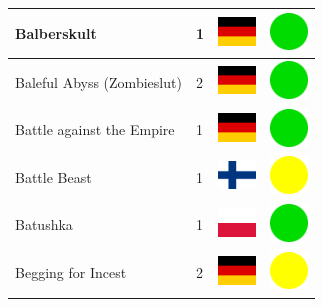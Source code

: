 \documentclass[12pt, a4paper, twoside]{report}
\begin{document}
\begin{center}
\begin{longtable}{|p{5cm}|p{2cm}|p{2cm}|p{2cm}|}
			Balberskult & 1 & \includegraphics[width=1cm]{4x3/de} & \includegraphics[width=1cm]{likes/y} \\ \hline
			Baleful Abyss (Zombieslut) & 2 & \includegraphics[width=1cm]{4x3/de} & \includegraphics[width=1cm]{likes/y} \\ \hline
			Battle against the Empire & 1 & \includegraphics[width=1cm]{4x3/de} & \includegraphics[width=1cm]{likes/y} \\ \hline
			Battle Beast & 1 & \includegraphics[width=1cm]{4x3/fi} & \includegraphics[width=1cm]{likes/m} \\ \hline
			Batushka & 1 & \includegraphics[width=1cm]{4x3/pl} & \includegraphics[width=1cm]{likes/y} \\ \hline
			Begging for Incest & 2 & \includegraphics[width=1cm]{4x3/de} & \includegraphics[width=1cm]{likes/m} \\ \hline

\end{longtable}
\end{center}
\end{document}
